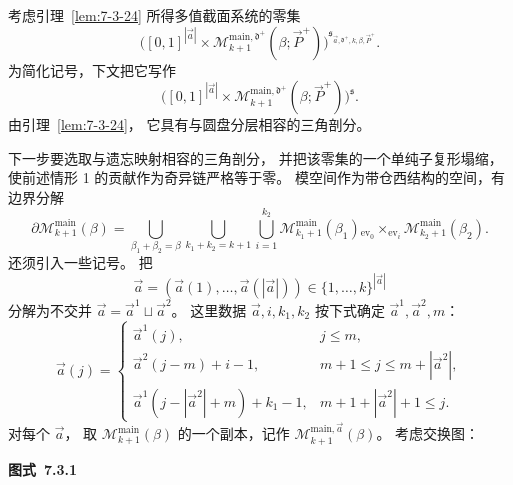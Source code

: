 
考虑引理~\ref{lem:7-3-24}
所得多值截面系统的零集
\[
\bigl([0,1]^{|\vec a|}\times
\mathcal M^{\mathrm{main},\mathfrak d^+}_{k+1}
(\beta;\vec P^+)\bigr)
^{\mathfrak s_{\vec a,\mathfrak d^+,k,\beta,\vec P^+}}.
\]
为简化记号，下文把它写作
\[
\bigl([0,1]^{|\vec a|}\times
\mathcal M^{\mathrm{main},\mathfrak d^+}_{k+1}
(\beta;\vec P^+)\bigr)^{\mathfrak s}.
\]
由引理~\ref{lem:7-3-24}，
它具有与圆盘分层相容的三角剖分。

下一步要选取与遗忘映射相容的三角剖分，
并把该零集的一个单纯子复形塌缩，
使前述情形 1 的贡献作为奇异链严格等于零。
模空间作为带仓西结构的空间，有边界分解
\[
\partial\mathcal M^{\mathrm{main}}_{k+1}(\beta)
=
\bigcup_{\beta_1+\beta_2=\beta}
\bigcup_{k_1+k_2=k+1}
\bigcup_{i=1}^{k_2}
\mathcal M^{\mathrm{main}}_{k_1+1}(\beta_1)
{}_{\operatorname{ev}_0}\times_{\operatorname{ev}_i}
\mathcal M^{\mathrm{main}}_{k_2+1}(\beta_2).
\]
还须引入一些记号。
把
\[
\vec a=(\vec a(1),\ldots,\vec a(|\vec a|))
\in\{1,\ldots,k\}^{|\vec a|}
\]
分解为不交并
$\vec a=\vec a^1\sqcup\vec a^2$。
这里数据 $\vec a,i,k_1,k_2$
按下式确定 $\vec a^1,\vec a^2,m$：
\begin{equation}
\vec a(j)=
\begin{cases}
\vec a^1(j),
&j\le m,\\
\vec a^2(j-m)+i-1,
&m+1\le j\le m+|\vec a^2|,\\
\vec a^1(j-|\vec a^2|+m)+k_1-1,
&m+1+|\vec a^2|+1\le j.
\end{cases}
\tag{7.3.26}\label{eq:7-3-26}
\end{equation}
对每个 $\vec a$，
取 $\mathcal M^{\mathrm{main}}_{k+1}(\beta)$
的一个副本，记作
$\mathcal M^{\mathrm{main},\vec a}_{k+1}(\beta)$。
考虑交换图：

\par\medskip\noindent\begin{minipage}{\textwidth}
\centering
{}
\par\smallskip
{\renewcommand{\thefigure}{7.3.1}
\normalfont\bfseries 图式~\thefigure\label{diag:7-3-1}}
\end{minipage}\par\medskip

